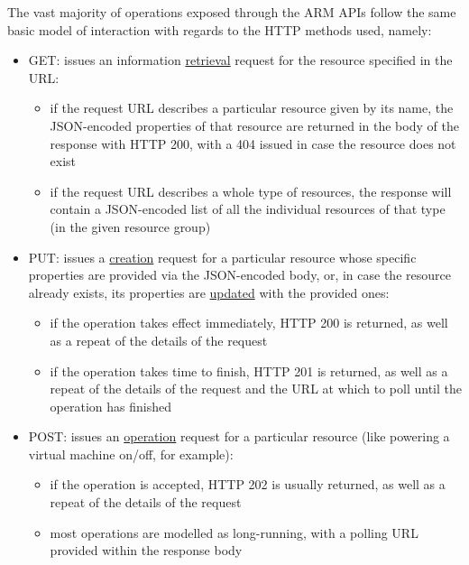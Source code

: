\documentclass[11pt]{report}
\begin{document}
The vast majority of operations exposed through the ARM APIs follow the same
basic model of interaction with regards to the HTTP methods used, namely:

\begin{itemize}
    \item{GET}: issues an information \ul{retrieval} request for the resource
        specified in the URL:
        \begin{itemize}
            \item{} if the request URL describes a particular resource given by
                its name, the JSON-encoded properties of that resource are
                returned in the body of the response with HTTP 200, with a 404
                issued in case the resource does not exist
            \item{} if the request URL describes a whole type of resources, the
                response will contain a JSON-encoded list of all the individual
                resources of that type (in the given resource group)
        \end{itemize}
    \item{PUT}: issues a \ul{creation} request for a particular resource whose
        specific properties are provided via the JSON-encoded body, or, in case
        the resource already exists, its properties are \ul{updated} with the
        provided ones:
        \begin{itemize}
            \item{} if the operation takes effect immediately, HTTP 200 is
                returned, as well as a repeat of the details of the request
            \item{} if the operation takes time to finish, HTTP 201 is
                returned, as well as a repeat of the details of the request and
                the URL at which to poll until the operation has finished
        \end{itemize}
    \item{POST}: issues an \ul{operation} request for a particular resource
        (like powering a virtual machine on/off, for example):
        \begin{itemize}
            \item{} if the operation is accepted, HTTP 202 is usually returned,
                as well as a repeat of the details of the request
            \item{} most operations are modelled as long-running, with a polling
                URL provided within the response body

\end{itemize}
\end{itemize}
\end{document}
